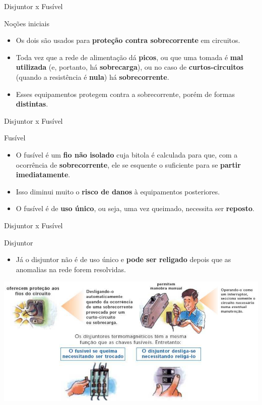 \begin{frame}{Disjuntor x Fusível}
	\begin{block}{Noções iniciais}
		\begin{itemize}
			\item Os dois são usados para \textbf{proteção contra sobrecorrente }em circuitos.
			\item Toda vez que a rede de alimentação dá \textbf{picos}, ou que uma tomada é \textbf{mal utilizada} (e, portanto, há \textbf{sobrecarga}), ou no caso de \textbf{curtos-circuitos} (quando a resistência é \textbf{nula}) há \textbf{sobrecorrente}.
			\item Esses equipamentos protegem contra a sobrecorrente, porém de formas \textbf{distintas}.
		\end{itemize}
	\end{block}

\end{frame}


\begin{frame}{Disjuntor x Fusível}
	\begin{block}{Fusível}
		\begin{itemize}
			\item O fusível é um \textbf{fio não isolado} cuja bitola é calculada para que, com a ocorrência de \textbf{sobrecorrente}, ele se esquente o suficiente para se \textbf{partir imediatamente}.
			\item Isso diminui muito o \textbf{risco de danos} à equipamentos posteriores.
			\item O fusível é de \textbf{uso único}, ou seja, uma vez queimado, necessita ser \textbf{reposto}.
		\end{itemize}
	\end{block}

\end{frame}


\begin{frame}{Disjuntor x Fusível}
	\begin{block}{Disjuntor}
		\begin{itemize}
			\item Já o disjuntor não é de uso único e \textbf{pode ser religado} depois que as anomalias na rede forem resolvidas.
		\end{itemize}
	\end{block}

	\centering
	\includegraphics[width=1\linewidth]{Figuras/Ch04/fig1}
\end{frame}


